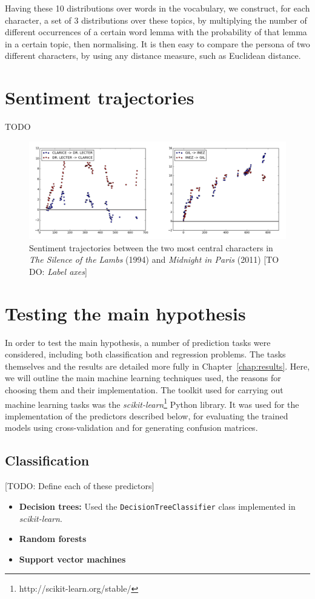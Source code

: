 \documentclass[bsc,frontabs,singlespacing,parskip, twoside]{infthesis}
\begin{document}
Having these 10 distributions over words in the vocabulary, we construct, for each character, a set of 3 distributions over these topics, by multiplying the number of different occurrences of a certain word lemma with the probability of that lemma in a certain topic, then normalising. It is then easy to compare the persona of two different characters, by using any distance measure, such as Euclidean distance.


\section{Sentiment trajectories}

TODO

\begin{figure}[h!]
	\includegraphics[scale=0.335]{figures/sentiment}
	\caption{Sentiment trajectories between the two most central characters in \textit{The Silence of the Lambs} (1994) and \textit{Midnight in Paris} (2011) [TO DO: \textit{Label axes}]}
\end{figure}

\section{Testing the main hypothesis}
\label{sec:predictors}
In order to test the main hypothesis, a number of prediction tasks were considered, including both classification and regression problems. The tasks themselves and the results are detailed more fully in Chapter~\ref{chap:results}. Here, we will outline the main machine learning techniques used, the reasons for choosing them and their implementation. The toolkit used for carrying out machine learning tasks was the \textit{scikit-learn}\footnote{http://scikit-learn.org/stable/} Python library. It was used for the implementation of the predictors described below, for evaluating the trained models using cross-validation and for generating confusion matrices.

\subsection{Classification}
[TODO: Define each of these predictors]
\begin{itemize}
	\item \textbf{Decision trees:} Used the \texttt{DecisionTreeClassifier} class implemented in \textit{scikit-learn}.
	\item \textbf{Random forests}
	\item \textbf{Support vector machines}
\end{itemize}
\end{document}
